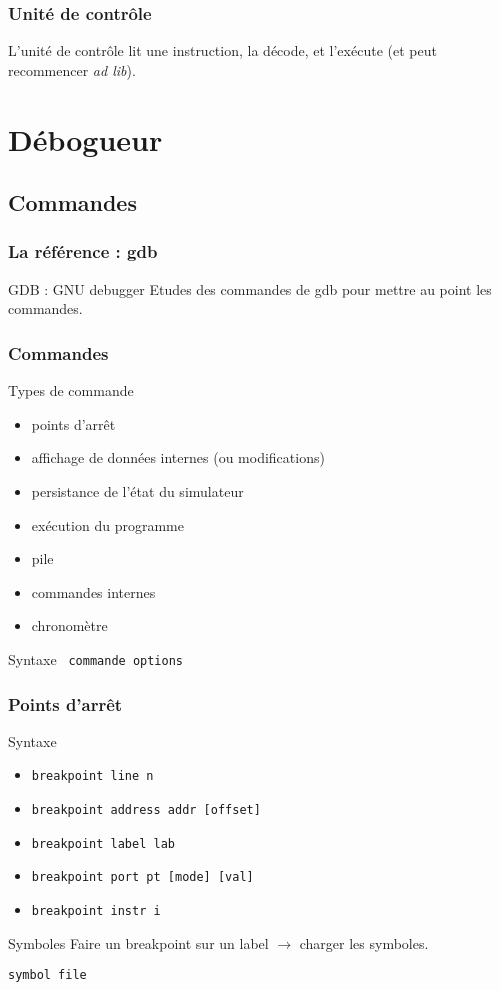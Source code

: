 \documentclass{beamer}
\begin{document}
\begin{frame}
\frametitle{Unité de contrôle}
L'unité de contrôle lit une instruction, la décode, et l'exécute (et peut recommencer \emph{ad lib}).
\end{frame}

\section{Débogueur}

\subsection{Commandes}

\begin{frame}
	\frametitle{La référence : gdb}
	GDB : GNU debugger
	Etudes des commandes de gdb pour mettre au point les commandes.
\end{frame}

\begin{frame}[fragile]
	\frametitle{Commandes}
	
	\begin{block}{Types de commande}
		\begin{itemize}
		\item points d'arrêt
		\item affichage de données internes (ou modifications)
		\item persistance de l'état du simulateur
		\item exécution du programme
		\item pile
		\item commandes internes
		\item chronomètre
		\end{itemize}
	\end{block}
	
	\begin{block}{Syntaxe}
		\verb| commande options |
	\end{block}
	
\end{frame}

\begin{frame}[fragile]
	\frametitle{Points d'arrêt}
	\begin{block}{Syntaxe}
		\begin{itemize}
		\item \verb|breakpoint line n|
		\item \verb|breakpoint address addr [offset]|
		\item \verb|breakpoint label lab|
		\item \verb|breakpoint port pt [mode] [val]|
		\item \verb|breakpoint instr i|
		\end{itemize}
	\end{block}
	
	\begin{block}{Symboles}
		Faire un breakpoint sur un label $\longrightarrow$ charger les symboles.
		
		\verb|symbol file|
	\end{block}
\end{frame}
\end{document}
